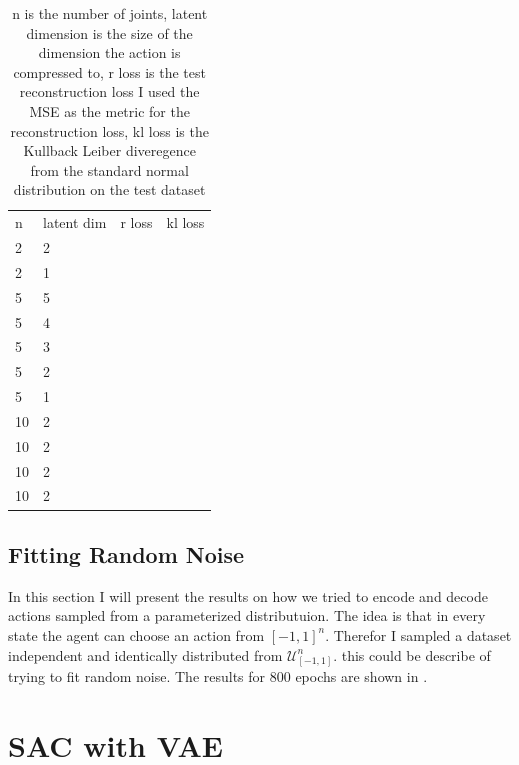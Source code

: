 \begin{table}[]
    \centering
    \begin{tabular}{l|l|r|r}
         n & latent dim & r loss & kl loss\\
         2 & 2 & & \\
         2 & 1 & & \\
         5 & 5 & & \\
         5 & 4 & & \\
         5 & 3 & & \\
         5 & 2 & & \\
         5 & 1 & & \\
         10 & 2 & & \\
         10 & 2 & & \\
         10 & 2 & & \\
         10 & 2 & & \\
    \end{tabular}
    \caption{n is the number of joints, latent dimension is the size of the dimension the action is compressed to, r loss is the test reconstruction loss I used the MSE as the metric for the reconstruction loss, kl loss is the Kullback Leiber diveregence from the standard normal distribution on the test dataset}
    \label{tab:CVAE results}
\end{table}

\subsection{Fitting Random Noise}

In this section I will present the results on how we tried to encode and decode actions sampled from a parameterized distributuion.
The idea is that in every state the agent can choose an action from $[-1, 1]^n$. Therefor I sampled a dataset independent and identically distributed from $\mathcal{U}^n_{[-1, 1]}$. this could be describe of trying to fit random noise.
The results for 800 epochs are shown in \figref{}.



\section{SAC with VAE}

